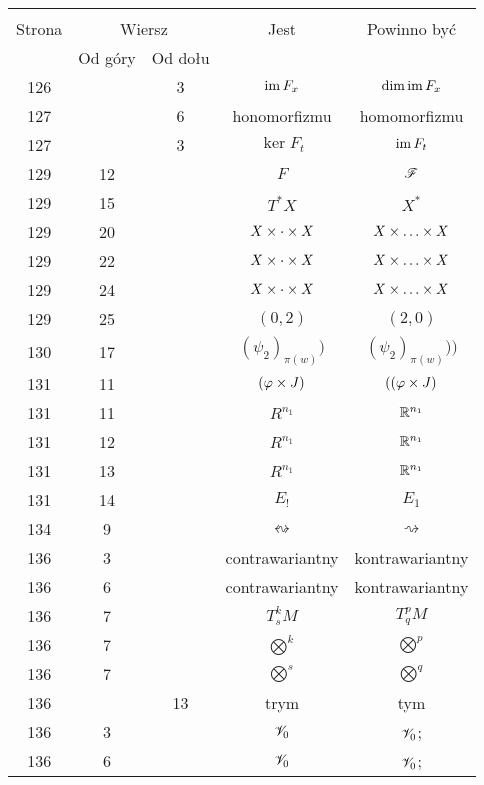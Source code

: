 \documentclass[a4paper,11pt]{article}
\begin{document}
\begin{center}
  \begin{tabular}{|c|c|c|c|c|}
    \hline
    & \multicolumn{2}{c|}{} & & \\
    Strona & \multicolumn{2}{c|}{Wiersz} & Jest
                              & Powinno być \\ \cline{2-3}
    & Od góry & Od dołu & & \\
    \hline
    126 & &  3 & $\mathrm{im} \, F_{ x }$ & $\dim\mathrm{im} \, F_{ x }$ \\
    127 & &  6 & honomorfizmu & homomorfizmu \\
    127 & &  3 & $\ker F_{ t }$ & $\mathrm{im} \, F_{ t }$ \\
    129 & 12 & & $F$ & $\mathcal{F}$ \\
    129 & 15 & & $T^{ * }X$ & $X^{ * }$ \\
    129 & 20 & & $X \times \cdot \times X$ & $X \times \ldots \times X$ \\
    129 & 22 & & $X \times \cdot \times X$ & $X \times \ldots \times X$ \\
    129 & 24 & & $X \times \cdot \times X$ & $X \times \ldots \times X$ \\
    129 & 25 & & $( 0, 2 )$ & $( 2, 0 )$ \\
    130 & 17 & & $( \psi_{ 2 } )_{ \pi( w ) })$
           & $( \psi_{ 2 } )_{ \pi( w ) }) \big)$ \\
    131 & 11 & & $( \varphi \times J )$ & $( ( \varphi \times J )$ \\
    131 & 11 & & $R^{ n_{ 1 } }$ & $\mathbb{R}^{ n_{ 1 } }$ \\
    131 & 12 & & $R^{ n_{ 1 } }$ & $\mathbb{R}^{ n_{ 1 } }$ \\
    131 & 13 & & $R^{ n_{ 1 } }$ & $\mathbb{R}^{ n_{ 1 } }$ \\
    131 & 14 & & $E_{ ! }$ & $E_{ 1 }$ \\
    134 &  9 & & $\leftrightsquigarrow$ & $\rightsquigarrow$ \\
    136 &  3 & & contrawariantny & kontrawariantny \\
    136 &  6 & & contrawariantny & kontrawariantny \\
    136 &  7 & & $T^{ k }_{ s }M$ & $T^{ p }_{ q }M$ \\
    136 &  7 & & $\bigotimes^{ k }$ & $\bigotimes^{ p }$ \\
    136 &  7 & & $\bigotimes^{ s }$ & $\bigotimes^{ q }$ \\
    136 & & 13 & trym & tym \\
    136 &  3 & & $\mathcal{V}_{ 0 }$ & $\mathcal{V}_{ 0 }$; \\
    136 &  6 & & $\mathcal{V}_{ 0 }$ & $\mathcal{V}_{ 0 }$; \\

\end{tabular}
\end{center}
\end{document}
